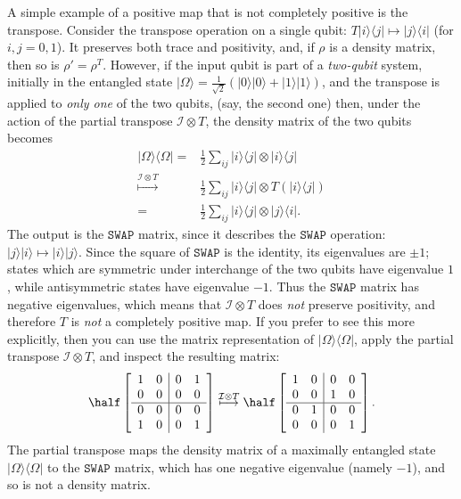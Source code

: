 \documentclass[fleqn]{article}
\begin{document}
A simple example of a positive map that is not completely positive is the transpose.
Consider the transpose operation on a single qubit: \(T|i\rangle\langle j|\mapsto|j\rangle\langle i|\) (for \(i,j=0,1\)).
It preserves both trace and positivity, and, if \(\rho\) is a density matrix, then so is \(\rho'=\rho^T\).
However, if the input qubit is part of a \emph{two-qubit} system, initially in the entangled state \(|\Omega\rangle=\frac{1}{\sqrt{2}}(|0\rangle|0\rangle+|1\rangle|1\rangle)\), and the transpose is applied to \emph{only one} of the two qubits, (say, the second one) then, under the action of the partial transpose \(\mathcal{I}\otimes T\), the density matrix of the two qubits becomes
\[
  \begin{aligned}
    |\Omega\rangle\langle\Omega|
    =& \frac{1}{2}\sum_{ij} |i\rangle\langle j| \otimes|i\rangle\langle j|
  \\\overset{\mathcal{I}\otimes T}{\longmapsto}& \frac{1}{2}\sum_{ij} |i\rangle\langle j| \otimes T(|i\rangle\langle j|)
  \\=& \frac{1}{2}\sum_{ij} |i\rangle\langle j| \otimes|j\rangle\langle i|.
  \end{aligned}
\]
The output is the \(\texttt{SWAP}\) matrix, since it describes the \(\texttt{SWAP}\) operation: \(|j\rangle|i\rangle\mapsto|i\rangle|j\rangle\).
Since the square of \(\texttt{SWAP}\) is the identity, its eigenvalues are \(\pm1\); states which are symmetric under interchange of the two qubits have eigenvalue \(1\), while antisymmetric states have eigenvalue \(-1\).
Thus the \(\texttt{SWAP}\) matrix has negative eigenvalues, which means that \(\mathcal{I}\otimes T\) does \emph{not} preserve positivity, and therefore \(T\) is \emph{not} a completely positive map.
If you prefer to see this more explicitly, then you can use the matrix representation of \(|\Omega\rangle\langle\Omega|\), apply the partial transpose \(\mathcal{I}\otimes T\), and inspect the resulting matrix:
\[
  \half\left[
  \begin{array}{cc|cc}
    1 & 0 & 0 & 1
  \\0 & 0 & 0 & 0\\
  \hline
  0 & 0 & 0 & 0
  \\1 & 0 & 0 & 1
  \end{array}\right]
  \overset{\mathcal{I}\otimes T}{\longmapsto}
  \half\left[
  \begin{array}{cc|cc}
    1 & 0 & 0 & 0
  \\0 & 0 & 1 & 0\\
  \hline
 0 & 1 & 0 & 0
  \\0 & 0 & 0 & 1
  \end{array}\right].
\]
The partial transpose maps the density matrix of a maximally entangled state \(|\Omega\rangle\langle\Omega|\) to the \(\texttt{SWAP}\) matrix, which has one negative eigenvalue (namely \(-1\)), and so is not a density matrix.
\end{document}
